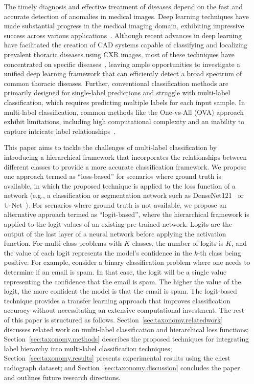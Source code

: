 \documentclass[authoryear,preprint,review,12pt]{elsarticle}
\begin{document}
The timely diagnosis and effective treatment of diseases depend on the fast and accurate detection of anomalies in medical images. Deep learning techniques have made substantial progress in the medical imaging domain, exhibiting impressive success across various applications~\cite{litjens_Survey_2017a,eshghali_Machine_2023}.  Although recent advances in deep learning have facilitated the creation of CAD systems capable of classifying and localizing prevalent thoracic diseases using CXR images, most of these techniques have concentrated on specific diseases~\cite{jaiswal_Identifying_2019,lakhani_Deep_2017,pasa_Efficient_2019,ausawalaithong_Automatic_2018}, leaving ample opportunities to investigate a unified deep learning framework that can efficiently detect a broad spectrum of common thoracic diseases. Further, conventional classification methods are primarily designed for single-label predictions and struggle with multi-label classification, which requires predicting multiple labels for each input sample. In multi-label classification, common methods like the One-vs-All (OVA) approach exhibit limitations, including high computational complexity and an inability to capture intricate label relationships~\cite{tsoumakas_MultiLabel_2007}.

This paper aims to tackle the challenges of multi-label classification by introducing a hierarchical framework that incorporates the relationships between different classes to provide a more accurate classification framework. We propose one approach termed as ``loss-based'' for scenarios where ground truth is available, in which the proposed technique is applied to the loss function of a network (e.g., a classification or segmentation network such as DenseNet121~\cite{huang_Densely_2017} or U-Net~\cite{ronneberger_UNet_2015}). For scenarios where ground truth is not available, we propose an alternative approach termed as ``logit-based'', where the hierarchical framework is applied to the logit values of an existing pre-trained network. Logits are the output of the last layer of a neural network before applying the activation function. For multi-class problems with $K$ classes, the number of logits is $K$, and the value of each logit represents the model's confidence in the $k$-th class being positive. For example, consider a binary classification problem where one needs to determine if an email is spam. In that case, the logit will be a single value representing the confidence that the email is spam. The higher the value of the logit, the more confident the model is that the email is spam.
The logit-based technique provides a transfer learning approach that improves classification accuracy without necessitating an extensive computational investment. The rest of this paper is structured as follows. Section~\ref{sec:taxonomy.relatedwork} discusses related work on multi-label classification and hierarchical loss functions; Section~\ref{sec:taxonomy.methods} describes the proposed techniques for integrating label hierarchy into multi-label classification techniques; Section~\ref{sec:taxonomy.results} presents experimental results using the chest radiograph dataset; and Section~\ref{sec:taxonomy.discussion} concludes the paper and outlines future research directions.
\end{document}
